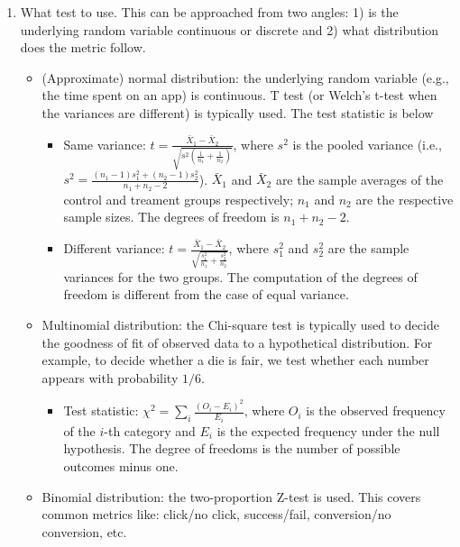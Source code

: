 \begin{enumerate}
                \item What test to use. This can be approached from two angles: 1) is the underlying random variable continuous or discrete and 2) what distribution does the metric follow.
                    \begin{itemize}
                        \item (Approximate) normal distribution:  the underlying random variable (e.g., the time spent on an app) is continuous. T test (or Welch's t-test when the variances are different) is typically used. The test statistic is below
                            \begin{itemize}
                                \item Same variance: $t = \frac{\bar{X}_1 - \bar{X}_2}{\sqrt{s^2(\frac{1}{n_1} + \frac{1}{n_2})}}$, where $s^2$ is the pooled variance (i.e., $s^2 = \frac{(n_1-1)s_1^2 + (n_2-1)s_2^2}{n_1 + n_2 - 2}$). $\bar{X}_1$ and $\bar{X}_2$ are the sample averages of the control and treament groups respectively; $n_1$ and $n_2$ are the respective sample sizes. The degrees of freedom is $n_1 + n_2 - 2$. 
                                \item Different variance: $t = \frac{\bar{X}_1 - \bar{X}_2}{\sqrt{\frac{s_1^2}{n_1} + \frac{s_2^2}{n_2}}}$, where $s_1^2$ and $s_2^2$ are the sample variances for the two groups. 
                                The computation of the degrees of freedom is different from the case of equal variance. 
                            \end{itemize}
                        \item Multinomial distribution: the Chi-square test is typically used to decide the goodness of fit of observed data to a hypothetical distribution. For example, to decide whether a die is fair, we test whether each number appears with probability $1/6$.
                            \begin{itemize}
                                \item Test statistic: $\chi^2 = \sum_{i}^{}{\frac{(O_i - E_i)^2}{E_i}}$, where $O_i$ is the observed frequency of the $i$-th category and $E_i$ is the expected frequency under the null hypothesis. The degree of freedoms is the number of possible outcomes minus one. 
                            \end{itemize}
                        \item Binomial distribution: the two-proportion Z-test is used. This covers common metrics like: click/no click, success/fail, conversion/no conversion, etc.

\end{itemize}
\end{enumerate}
